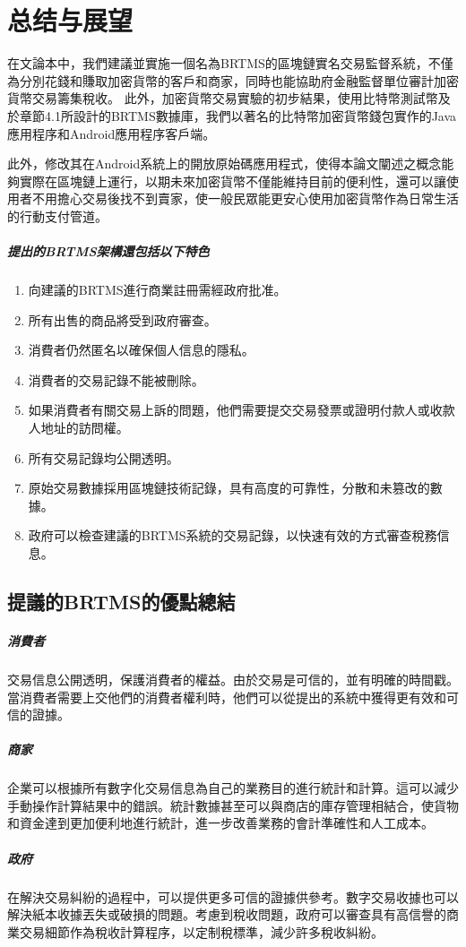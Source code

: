 \chapter{总结与展望}
在文論本中，我們建議並實施一個名為BRTMS的區塊鏈實名交易監督系統，不僅為分別花錢和賺取加密貨幣的客戶和商家，同時也能協助府金融監督單位審計加密貨幣交易籌集稅收。 此外，加密貨幣交易實驗的初步結果，使用比特幣測試幣及於章節4.1所設計的BRTMS數據庫，我們以著名的比特幣加密貨幣錢包實作的Java應用程序和Android應用程序客戶端。
	
此外，修改其在Android系統上的開放原始碼應用程式，使得本論文闡述之概念能夠實際在區塊鏈上運行，以期未來加密貨幣不僅能維持目前的便利性，還可以讓使用者不用擔心交易後找不到賣家，使一般民眾能更安心使用加密貨幣作為日常生活的行動支付管道。

	\paragraph{提出的BRTMS架構還包括以下特色}

		\begin{enumerate}
			\item 向建議的BRTMS進行商業註冊需經政府批准。
			\item 所有出售的商品將受到政府審查。
			\item 消費者仍然匿名以確保個人信息的隱私。
			\item 消費者的交易記錄不能被刪除。
			\item 如果消費者有關交易上訴的問題，他們需要提交交易發票或證明付款人或收款人地址的訪問權。
			\item 所有交易記錄均公開透明。
			\item 原始交易數據採用區塊鏈技術記錄，具有高度的可靠性，分散和未篡改的數據。
			\item 政府可以檢查建議的BRTMS系統的交易記錄，以快速有效的方式審查稅務信息。
		\end{enumerate}

	\section{提議的BRTMS的優點總結}

		\paragraph{消費者}交易信息公開透明，保護消費者的權益。由於交易是可信的，並有明確的時間戳。當消費者需要上交他們的消費者權利時，他們可以從提出的系統中獲得更有效和可信的證據。
		\paragraph{商家}企業可以根據所有數字化交易信息為自己的業務目的進行統計和計算。這可以減少手動操作計算結果中的錯誤。統計數據甚至可以與商店的庫存管理相結合，使貨物和資金達到更加便利地進行統計，進一步改善業務的會計準確性和人工成本。
		\paragraph{政府}在解決交易糾紛的過程中，可以提供更多可信的證據供參考。數字交易收據也可以解決紙本收據丟失或破損的問題。考慮到稅收問題，政府可以審查具有高信譽的商業交易細節作為稅收計算程序，以定制稅標準，減少許多稅收糾紛。